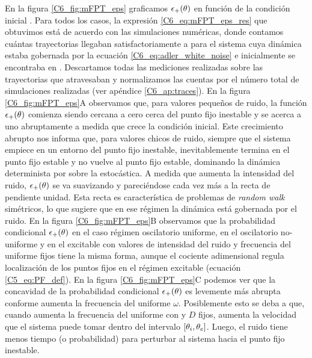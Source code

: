 \documentclass[./main.tex]{subfiles}
\begin{document}
En la figura \ref{C6_fig:mFPT_eps} graficamos $\epsilon_{+}(\theta)$ en función de la condición inicial \xx. Para todos los casos, la expresión \ref{C6_eq:mFPT_eps_res} que obtuvimos está de acuerdo con las simulaciones numéricas, donde contamos cuántas trayectorias llegaban satisfactoriamente a \xxe para el sistema cuya dinámica estaba gobernada por la ecuación \ref{C6_eq:adler_white_noise} e inicialmente se encontraba en \xx. Descartamos todas las mediciones realizadas sobre las trayectorias que atravesaban \xxi y normalizamos las cuentas por el número total de simulaciones realizadas (ver apéndice \ref{C6_ap:traces}). En la figura \ref{C6_fig:mFPT_eps}A observamos que, para valores pequeños de ruido, la función $\epsilon_{+}(\theta)$ comienza siendo cercana a cero cerca del punto fijo inestable y se acerca a uno abruptamente a medida que crece la condición inicial. Este crecimiento abrupto nos informa que, para valores chicos de ruido, siempre que el sistema empiece en un entorno del punto fijo inestable, inevitablemente termina en el punto fijo estable y no vuelve al punto fijo estable, dominando la dinámica determinista por sobre la estocástica. A medida que aumenta la intensidad del ruido, $\epsilon_{+}(\theta)$ se va suavizando y pareciéndose cada vez más a la recta de pendiente unidad. Esta recta es característica de problemas de \textit{random walk} simétricos, lo que sugiere que en ese régimen la dinámica está gobernada por el ruido. En la figura \ref{C6_fig:mFPT_eps}B observamos que la probabilidad condicional $\epsilon_{+}(\theta)$ en el caso régimen oscilatorio uniforme, en el oscilatorio no-uniforme y en el excitable con valores de intensidad del ruido y frecuencia del uniforme fijos tiene la misma forma, aunque el cociente adimensional \dddelta regula localización de los puntos fijos en el régimen excitable (ecuación \ref{C5_eq:PF_def}). En la figura  \ref{C6_fig:mFPT_eps}C podemos ver que la concavidad de la probabilidad condicional $\epsilon_{+}(\theta)$ es levemente más abrupta conforme aumenta la frecuencia del uniforme $\omega$. Posiblemente esto se deba a que, cuando aumenta la frecuencia del uniforme con \dddelta y $D$ fijos, aumenta la velocidad que el sistema puede tomar dentro del intervalo $[\theta_i,\theta_e]$. Luego, el ruido tiene menos tiempo (o probabilidad) para perturbar al sistema hacia el punto fijo inestable. 
\end{document}
